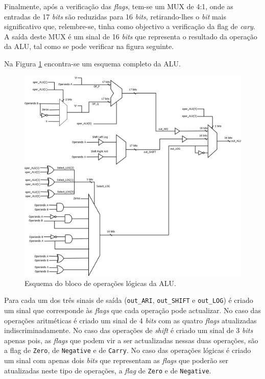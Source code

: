 \documentclass[11pt]{article}
\numberwithin{equation}{section}
\begin{document}
Finalmente, após a verificação das \textit{flags}, tem-se um MUX de 4:1, onde as entradas de 17 \textit{bits} são reduzidas para 16 \textit{bits}, retirando-lhes o \textit{bit} mais significativo que, relembre-se, tinha como objectivo a verificação da flag de \textit{cary}. A saída deste MUX é um sinal de 16 \textit{bits} que representa o resultado da operação da ALU, tal como se pode verificar na figura seguinte.

Na Figura \ref{fig:ALU} encontra-se um esquema completo da ALU.

\begin{figure}[H]
	\centering
	\includegraphics[keepaspectratio=true, scale=0.40]{imagens/ALU}
	\caption{Esquema do bloco de operações lógicas da ALU.}
	\vspace{-0.8em}
	\label{fig:ALU}
\end{figure}

Para cada um dos três sinais de saída (\texttt{out\_ARI}, \texttt{out\_SHIFT} e \texttt{out\_LOG}) é criado um sinal que corresponde às \textit{flags} que cada operação pode actualizar. No caso das operações aritméticas é criado um sinal de 4 \textit{bits} com as quatro \textit{flags} atualizadas indiscriminadamente. No caso das operações de \textit{shift} é criado um sinal de 3 \textit{bits} apenas pois, as \textit{flags} que podem vir a ser actualizadas nessas duas operações, são a flag de \texttt{Zero}, de \texttt{Negative} e de \texttt{Carry}. No caso das operações lógicas é criado um sinal com apenas dois \textit{bits} que representam as \textit{flags} que poderão ser atualizadas neste tipo de operações, a \textit{flag} de \texttt{Zero} e de \texttt{Negative}.
\end{document}
